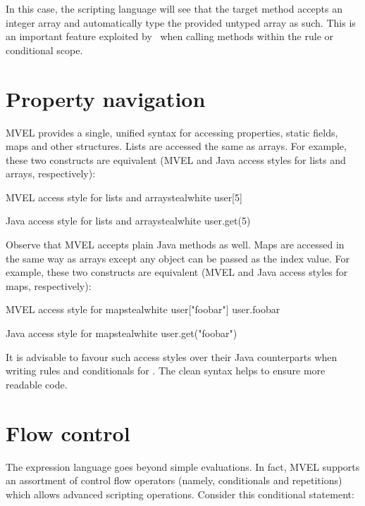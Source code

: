 In this case, the scripting language will see that the target method accepts an integer array and automatically type the provided untyped array as such. This is an important feature exploited by \arara\ when calling methods within the rule or conditional scope.

\section{Property navigation}
\label{sec:propertynavigation}

MVEL provides a single, unified syntax for accessing properties, static fields, maps and other structures. Lists are accessed the same as arrays. For example, these two constructs are equivalent (MVEL and Java access styles for lists and arrays, respectively):

\begin{codebox}{MVEL access style for lists and arrays}{teal}{\icnote}{white}
user[5]
\end{codebox}

\begin{codebox}{Java access style for lists and arrays}{teal}{\icnote}{white}
user.get(5)
\end{codebox}

Observe that MVEL accepts plain Java methods as well. Maps are accessed in the same way as arrays except any object can be passed as the index value. For example, these two constructs are equivalent (MVEL and Java access styles for maps, respectively):

\begin{codebox}{MVEL access style for maps}{teal}{\icnote}{white}
user["foobar"]
user.foobar
\end{codebox}

\begin{codebox}{Java access style for maps}{teal}{\icnote}{white}
user.get("foobar")
\end{codebox}

It is advisable to favour such access styles over their Java counterparts when writing rules and conditionals for \arara. The clean syntax helps to ensure more readable code.

\section{Flow control}
\label{sec:mvelflowcontrol}

The expression language goes beyond simple evaluations. In fact, MVEL supports an assortment of control flow operators (namely, conditionals and repetitions) which allows advanced scripting operations. Consider this conditional statement:

